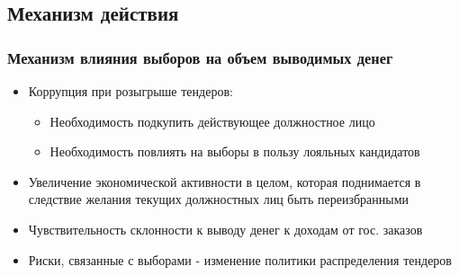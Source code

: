 \subsection{Механизм действия}

\begin{frame}
\frametitle{Механизм влияния выборов на объем выводимых денег}
\begin{itemize}
\item Коррупция при розыгрыше тендеров:
	\begin{itemize}
	\item Необходимость подкупить действующее должностное лицо
	\item Необходимость повлиять на выборы в пользу лояльных кандидатов
	\end{itemize}

\item Увеличение экономической активности в целом, которая поднимается в следствие желания текущих должностных лиц быть переизбранными

\item Чувствительность склонности к выводу денег к доходам от гос. заказов

\item Риски, связанные с выборами - изменение политики распределения тендеров
\end{itemize}
\end{frame}
